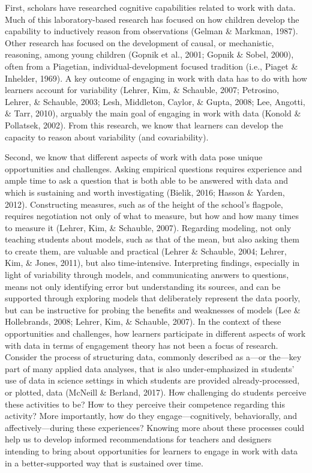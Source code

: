 \documentclass[]{msu-thesis}
\theoremstyle{definition}
\theoremstyle{definition}
\theoremstyle{definition}
\theoremstyle{remark}
\begin{document}
First, scholars have researched cognitive capabilities related to work
with data. Much of this laboratory-based research has focused on how
children develop the capability to inductively reason from observations
(Gelman \& Markman, 1987). Other research has focused on the development
of causal, or mechanistic, reasoning, among young children (Gopnik et
al., 2001; Gopnik \& Sobel, 2000), often from a Piagetian,
individual-development focused tradition (i.e., Piaget \& Inhelder,
1969). A key outcome of engaging in work with data has to do with how
learners account for variability (Lehrer, Kim, \& Schauble, 2007;
Petrosino, Lehrer, \& Schauble, 2003; Lesh, Middleton, Caylor, \& Gupta,
2008; Lee, Angotti, \& Tarr, 2010), arguably the main goal of engaging
in work with data (Konold \& Pollatsek, 2002). From this research, we
know that learners can develop the capacity to reason about variability
(and covariability).

Second, we know that different aspects of work with data pose unique
opportunities and challenges. Asking empirical questions requires
experience and ample time to ask a question that is both able to be
answered with data and which is sustaining and worth investigating
(Bielik, 2016; Hasson \& Yarden, 2012). Constructing measures, such as
of the height of the school's flagpole, requires negotiation not only of
what to measure, but how and how many times to measure it (Lehrer, Kim,
\& Schauble, 2007). Regarding modeling, not only teaching students about
models, such as that of the mean, but also asking them to create them,
are valuable and practical (Lehrer \& Schauble, 2004; Lehrer, Kim, \&
Jones, 2011), but also time-intensive. Interpreting findings, especially
in light of variability through models, and communicating answers to
questions, means not only identifying error but understanding its
sources, and can be supported through exploring models that deliberately
represent the data poorly, but can be instructive for probing the
benefits and weaknesses of models (Lee \& Hollebrands, 2008; Lehrer,
Kim, \& Schauble, 2007). In the context of these opportunities and
challenges, how learners participate in different aspects of work with
data in terms of engagement theory has not been a focus of research.
Consider the process of structuring data, commonly described as a---or
the---key part of many applied data analyses, that is also
under-emphasized in students' use of data in science settings in which
students are provided already-processed, or plotted, data (McNeill \&
Berland, 2017). How challenging do students perceive these activities to
be? How to they perceive their competence regarding this activity? More
importantly, how do they engage---cognitively, behaviorally, and
affectively---during these experiences? Knowing more about these
processes could help us to develop informed recommendations for teachers
and designers intending to bring about opportunities for learners to
engage in work with data in a better-supported way that is sustained
over time.
\end{document}
